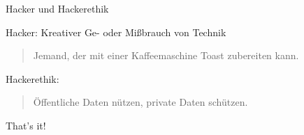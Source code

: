 \documentclass[hyperref={pdfpagelabels=false}]{beamer}
\begin{document}
\begin{frame}{Hacker und Hackerethik}
	\begin{block}{Hacker: Kreativer Ge- oder Mißbrauch von Technik}
		\begin{quotation}
			Jemand, der mit einer Kaffeemaschine Toast zubereiten kann.
		\end{quotation}
	\end{block}

	\begin{block}{Hackerethik:}
		\begin{quotation}
			Öffentliche Daten nützen, private Daten schützen.
		\end{quotation}
	\end{block}
\end{frame}









\begin{frame}[plain]
	That's it!
	\begin{center}
	\end{center}
\end{frame}

\begin{frame}[plain]
	\theendnotes
\end{frame}
\end{document}
